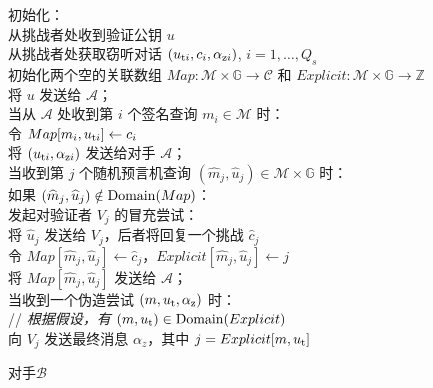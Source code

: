 \begin{figure}
  \hspace*{45pt} 初始化：\\
  \hspace*{70pt} 从挑战者处收到验证公钥 $u$\\
  \hspace*{70pt} 从挑战者处获取窃听对话 $(u_{{\rm t}i},c_i,\alpha_{{\rm z}i})$, $i=1,\dots,Q_s$\\
  \hspace*{70pt} 初始化两个空的关联数组 $Map:\mathcal{M}\times\mathbb{G}\to\mathcal{C}$ 和 $Explicit:\mathcal{M}\times\mathbb{G}\to\mathbb{Z}$\\
  \hspace*{70pt} 将 $u$ 发送给 $\mathcal{A}$；\\
  \hspace*{45pt} 当从 $\mathcal{A}$ 处收到第 $i$ 个签名查询 $m_i\in\mathcal{M}$ 时：\\
  \hspace*{70pt} 令 $Map[m_i,u_{{\rm t}i}]\leftarrow c_i$\\
  \hspace*{70pt} 将 $(u_{{\rm t}i},\alpha_{{\rm z}i})$ 发送给对手 $\mathcal{A}$；\\
  \hspace*{45pt} 当收到第 $j$ 个随机预言机查询 $(\widehat m_j,\widehat u_j)\in\mathcal{M}\times\mathbb{G}$ 时：\\
  \hspace*{70pt} 如果 $(\widehat m_j,\widehat u_j)\notin{\rm Domain}(Map)$：\\
  \hspace*{95pt} 发起对验证者 $V_j$ 的冒充尝试：\\
  \hspace*{120pt} 将 $\widehat u_j$ 发送给 $V_j$，后者将回复一个挑战 $\widehat c_j$\\
  \hspace*{95pt} 令 $Map[\widehat m_j,\widehat u_j]\leftarrow\widehat c_j$，$Explicit[\widehat m_j,\widehat u_j]\leftarrow j$\\
  \hspace*{70pt} 将 $Map[\widehat m_j,\widehat u_j]$ 发送给 $\mathcal{A}$；\\
  \hspace*{45pt} 当收到一个伪造尝试 $(m,u_{\rm t},\alpha_{\rm z})$ 时：\\
  \hspace*{70pt} // \emph{根据假设，有 $(m,u_{\rm t})\in{\rm Domain}(Explicit)$}\\
  \hspace*{70pt} 向 $V_j$ 发送最终消息 $\alpha_z$，其中 $j=Explicit[m,u_{\rm t}]$
  \caption{对手$\mathcal{B}$}
  \label{fig:19-4}
\end{figure}

